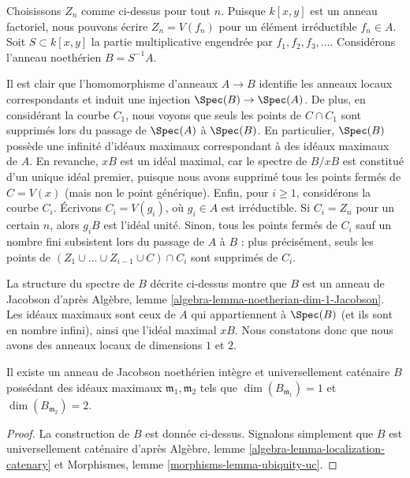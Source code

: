 \medskip\noindent
Choisissons $Z_n$ comme ci-dessus pour tout $n$. Puisque $k[x, y]$ est un anneau factoriel,
nous pouvons écrire $Z_n = V(f_n)$ pour un élément irréductible $f_n \in A$.
Soit $S \subset k[x, y]$ la partie multiplicative engendrée
par $f_1, f_2, f_3, \ldots$. Considérons l'anneau noethérien $B = S^{-1}A$.

\medskip\noindent
Il est clair que l'homomorphisme d'anneaux $A \to B$ identifie les anneaux locaux
correspondants et induit une injection $\Spec(B) \to \Spec(A)$.
De plus, en considérant la courbe $C_1$, nous voyons que
seuls les points de $C \cap C_1$ sont supprimés lors du passage
de $\Spec(A)$ à $\Spec(B)$.
En particulier, $\Spec(B)$ possède une infinité
d'idéaux maximaux correspondant à des idéaux
maximaux de $A$. En revanche, $xB$ est un idéal maximal, car
le spectre de $B/xB$ est constitué d'un unique idéal premier,
puisque nous avons supprimé tous les points fermés de $C = V(x)$ (mais non
le point générique).
Enfin, pour $i \geq 1$, considérons la courbe $C_i$.
Écrivons $C_i = V(g_i)$, où $g_i \in A$ est irréductible.
Si $C_i = Z_n$ pour un certain $n$, alors $g_iB$ est l'idéal unité.
Sinon, tous les points fermés de $C_i$ sauf un nombre fini
subsistent lors du passage de $A$ à $B$ :
plus précisément, seuls les points de
$(Z_1 \cup \ldots \cup Z_{i - 1} \cup C) \cap C_i$
sont supprimés de $C_i$.

\medskip\noindent
La structure du spectre de $B$ décrite ci-dessus
montre que $B$ est un anneau de Jacobson d'après
Algèbre, lemme \ref{algebra-lemma-noetherian-dim-1-Jacobson}.
Les idéaux maximaux sont ceux de $A$
qui appartiennent à $\Spec(B)$ (et ils sont en nombre infini),
ainsi que l'idéal maximal $xB$. Nous constatons donc que nous avons
des anneaux locaux de dimensions $1$ et $2$.

\begin{lemma}
\label{lemma-Noetherian-Jacobson}
Il existe un anneau de Jacobson noethérien intègre et universellement caténaire $B$
possédant des idéaux maximaux $\mathfrak m_1, \mathfrak m_2$ tels que
$\dim(B_{\mathfrak m_1}) = 1$ et $\dim(B_{\mathfrak m_2}) = 2$.
\end{lemma}

\begin{proof}
La construction de $B$ est donnée ci-dessus. Signalons simplement que
$B$ est universellement caténaire d'après
Algèbre, lemme \ref{algebra-lemma-localization-catenary} et
Morphismes, lemme \ref{morphisms-lemma-ubiquity-uc}.
\end{proof}




